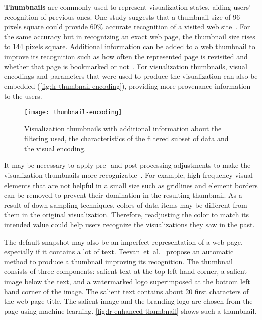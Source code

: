 \textbf{Thumbnails} are commonly used to represent visualization states, aiding users' recognition of previous ones. One study suggests that a thumbnail size of 96 pixels square could provide 60\% accurate recognition of a visited web site~\cite{Kaasten2001}. For the same accuracy but in recognizing an exact web page, the thumbnail size rises to 144 pixels square. Additional information can be added to a web thumbnail to improve its recognition such as how often the represented page is revisited and whether that page is bookmarked or not~\cite{Cockburn1999}. For visualization thumbnails, visual encodings and parameters that were used to produce the visualization can also be embedded (\autoref{fig:lr-thumbnail-encoding}), providing more provenance information to the users.

\begin{figure}[!htb]
	\centering
	\texttt{[image: thumbnail-encoding]}
	\caption[Visualization thumbnails]{Visualization thumbnails with additional information about the filtering used, the characteristics of the filtered subset of data and the visual encoding. }
	\label{fig:lr-thumbnail-encoding}
\end{figure}

It may be necessary to apply pre- and post-processing adjustments to make the visualization thumbnails more recognizable~\cite{Heer2008}. For example, high-frequency visual elements that are not helpful in a small size such as gridlines and element borders can be removed to prevent their domination in the resulting thumbnail. As a result of down-sampling techniques, colors of data items may be different from them in the original visualization. Therefore, readjusting the color to match its intended value could help users recognize the visualizations they saw in the past.

The default snapshot may also be an imperfect representation of a web page, especially if it contains a lot of text. Teevan~et~al.~\cite{Teevan2009} propose an automatic method to produce a thumbnail improving its recognition. The thumbnail consists of three components: salient text at the top-left hand corner, a salient image below the text, and a watermarked logo superimposed at the bottom left hand corner of the image. The salient text contains about 20 first characters of the web page title. The salient image and the branding logo are chosen from the page using machine learning. \autoref{fig:lr-enhanced-thumbnail} shows such a thumbnail.

